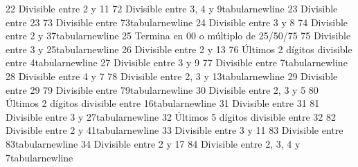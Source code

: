 {}22 \markdownRendererAmpersand{} Divisible entre 2 y 11 \markdownRendererAmpersand{} 72 \markdownRendererAmpersand{} Divisible entre 3, 4 y 9\markdownRendererBackslash{}tabularnewline\markdownRendererSoftLineBreak
{}23 \markdownRendererAmpersand{} Divisible entre 23 \markdownRendererAmpersand{} 73 \markdownRendererAmpersand{} Divisible entre 73\markdownRendererBackslash{}tabularnewline\markdownRendererSoftLineBreak
{}24 \markdownRendererAmpersand{} Divisible entre 3 y 8 \markdownRendererAmpersand{} 74 \markdownRendererAmpersand{} Divisible entre 2 y 37\markdownRendererBackslash{}tabularnewline\markdownRendererSoftLineBreak
{}25 \markdownRendererAmpersand{} Termina en 00 o múltiplo de 25/50/75 \markdownRendererAmpersand{} 75 \markdownRendererAmpersand{} Divisible entre 3 y 25\markdownRendererBackslash{}tabularnewline\markdownRendererSoftLineBreak
{}26 \markdownRendererAmpersand{} Divisible entre 2 y 13 \markdownRendererAmpersand{} 76 \markdownRendererAmpersand{} Últimos 2 dígitos divisible entre 4\markdownRendererBackslash{}tabularnewline\markdownRendererSoftLineBreak
{}27 \markdownRendererAmpersand{} Divisible entre 3 y 9 \markdownRendererAmpersand{} 77 \markdownRendererAmpersand{} Divisible entre 7\markdownRendererBackslash{}tabularnewline\markdownRendererSoftLineBreak
{}28 \markdownRendererAmpersand{} Divisible entre 4 y 7 \markdownRendererAmpersand{} 78 \markdownRendererAmpersand{} Divisible entre 2, 3 y 13\markdownRendererBackslash{}tabularnewline\markdownRendererSoftLineBreak
{}29 \markdownRendererAmpersand{} Divisible entre 29 \markdownRendererAmpersand{} 79 \markdownRendererAmpersand{} Divisible entre 79\markdownRendererBackslash{}tabularnewline\markdownRendererSoftLineBreak
{}30 \markdownRendererAmpersand{} Divisible entre 2, 3 y 5 \markdownRendererAmpersand{} 80 \markdownRendererAmpersand{} Últimos 2 dígitos divisible entre 16\markdownRendererBackslash{}tabularnewline\markdownRendererSoftLineBreak
{}31 \markdownRendererAmpersand{} Divisible entre 31 \markdownRendererAmpersand{} 81 \markdownRendererAmpersand{} Divisible entre 3 y 27\markdownRendererBackslash{}tabularnewline\markdownRendererSoftLineBreak
{}32 \markdownRendererAmpersand{} Últimos 5 dígitos divisible entre 32 \markdownRendererAmpersand{} 82 \markdownRendererAmpersand{} Divisible entre 2 y 41\markdownRendererBackslash{}tabularnewline\markdownRendererSoftLineBreak
{}33 \markdownRendererAmpersand{} Divisible entre 3 y 11 \markdownRendererAmpersand{} 83 \markdownRendererAmpersand{} Divisible entre 83\markdownRendererBackslash{}tabularnewline\markdownRendererSoftLineBreak
{}34 \markdownRendererAmpersand{} Divisible entre 2 y 17 \markdownRendererAmpersand{} 84 \markdownRendererAmpersand{} Divisible entre 2, 3, 4 y 7\markdownRendererBackslash{}tabularnewline\markdownRendererSoftLineBreak
